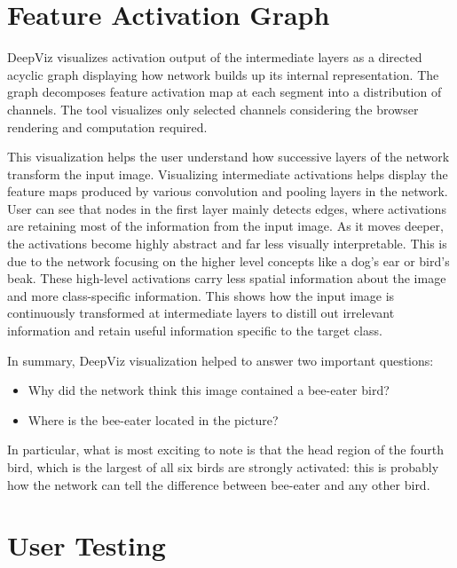 \clearpage
\section*{Feature Activation Graph}

DeepViz visualizes activation output of the intermediate layers as a directed acyclic graph displaying how network builds up its internal representation. The graph decomposes feature activation map at each segment into a distribution of channels. The tool visualizes only selected channels considering the browser rendering and computation required.

This visualization helps the user understand how successive layers of the network transform the input image. Visualizing intermediate activations helps display the feature maps produced by various convolution and pooling layers in the network. User can see that nodes in the first layer mainly detects edges, where activations are retaining most of the information from the input image. As it moves deeper, the activations become highly abstract and far less visually interpretable. This is due to the network focusing on the higher level concepts like a dog's ear or bird's beak. These high-level activations carry less spatial information about the image and more class-specific information. This shows how the input image is continuously transformed at intermediate layers to distill out irrelevant information and retain useful information specific to the target class.

In summary, DeepViz visualization helped to answer two important questions:
\begin{itemize}
\item  Why did the network think this image contained a bee-eater bird?
\vspace{-1em}
\item Where is the bee-eater located in the picture?
\end{itemize}
\vspace{-1em}
In particular, what is most exciting to note is that the head region of the fourth bird, which is the largest of all six birds are strongly activated: this is probably how the network can tell the difference between bee-eater and any other bird.

\vspace{-1em}
\section{User Testing}


